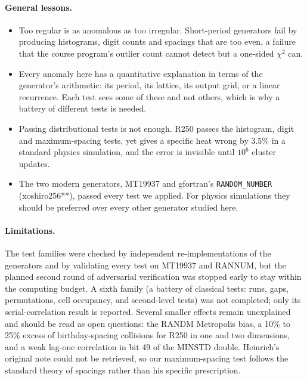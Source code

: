 \documentclass[11pt]{article}
\begin{document}
\paragraph{General lessons.}
\begin{itemize}
\item Too regular is as anomalous as too irregular. Short-period generators fail by producing histograms, digit counts and spacings that are too even, a failure that the course program's outlier count cannot detect but a one-sided $\chi^2$ can.
\item Every anomaly here has a quantitative explanation in terms of the generator's arithmetic: its period, its lattice, its output grid, or a linear recurrence. Each test sees some of these and not others, which is why a battery of different tests is needed.
\item Passing distributional tests is not enough. R250 passes the histogram, digit and maximum-spacing tests, yet gives a specific heat wrong by 3.5\% in a standard physics simulation, and the error is invisible until $10^6$ cluster updates.
\item The two modern generators, MT19937 and gfortran's \texttt{RANDOM\_NUMBER} (xoshiro256**), passed every test we applied. For physics simulations they should be preferred over every other generator studied here.
\end{itemize}

\paragraph{Limitations.} The test families were checked by independent re-implementations of the generators and by validating every test on MT19937 and RANNUM, but the planned second round of adversarial verification was stopped early to stay within the computing budget. A sixth family (a battery of classical tests: runs, gaps, permutations, cell occupancy, and second-level tests) was not completed; only its serial-correlation result is reported. Several smaller effects remain unexplained and should be read as open questions: the RANDM Metropolis bias, a 10\% to 25\% excess of birthday-spacing collisions for R250 in one and two dimensions, and a weak lag-one correlation in bit 49 of the MINSTD double. Heinrich's original note could not be retrieved, so our maximum-spacing test follows the standard theory of spacings rather than his specific prescription.
\end{document}
